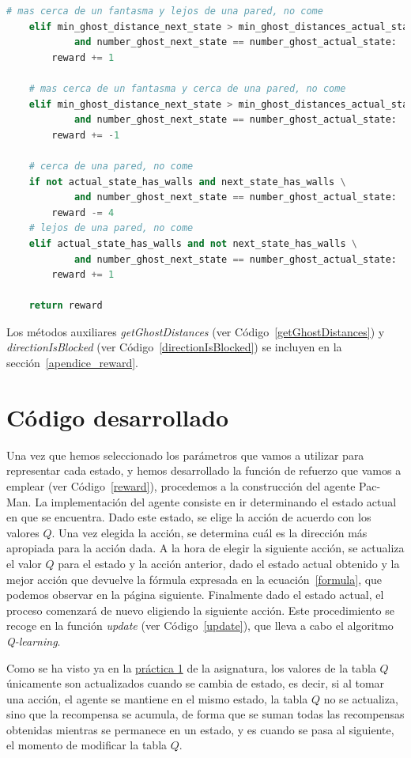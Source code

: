 \documentclass[11pt]{exam}
\begin{document}
\begin{lstlisting}[caption={Función de refuerzo.}, label={reward}, language=python, basicstyle=\footnotesize]
	# mas cerca de un fantasma y lejos de una pared, no come
	elif min_ghost_distance_next_state > min_ghost_distances_actual_state and not actual_state_has_walls \
			and number_ghost_next_state == number_ghost_actual_state:
		reward += 1
	
	# mas cerca de un fantasma y cerca de una pared, no come
	elif min_ghost_distance_next_state > min_ghost_distances_actual_state and actual_state_has_walls \
			and number_ghost_next_state == number_ghost_actual_state:
		reward += -1
	
	# cerca de una pared, no come
	if not actual_state_has_walls and next_state_has_walls \
			and number_ghost_next_state == number_ghost_actual_state:
		reward -= 4
	# lejos de una pared, no come
	elif actual_state_has_walls and not next_state_has_walls \
			and number_ghost_next_state == number_ghost_actual_state:
		reward += 1
	
	return reward	
\end{lstlisting}

Los métodos auxiliares \textit{getGhostDistances} (ver Código~\ref{getGhostDistances}) y \textit{directionIsBlocked} (ver Código~\ref{directionIsBlocked}) se incluyen en la sección~\ref*{apendice_reward}.

\section{Código desarrollado}\label{codigo}

Una vez que hemos seleccionado los parámetros que vamos a utilizar para representar cada estado, y hemos desarrollado la función de refuerzo que vamos a emplear (ver Código~\ref{reward}), procedemos a la construcción del agente Pac-Man. La implementación del agente consiste en ir determinando el estado actual en que se encuentra. Dado este estado, se elige la acción de acuerdo con los valores $Q$. Una vez elegida la acción, se determina cuál es la dirección más apropiada para la acción dada. A la hora de elegir la siguiente acción, se actualiza el valor $Q$ para el estado y la acción anterior, dado el estado actual obtenido y la mejor acción que devuelve la fórmula expresada en la ecuación~\ref{formula}, que podemos observar en la página siguiente. Finalmente dado el estado actual, el proceso comenzará de nuevo eligiendo la siguiente acción. Este procedimiento se recoge en la función \textit{update} (ver Código~\ref{update}), que lleva a cabo el algoritmo \textit{Q-learning}. 

Como se ha visto ya en la \href{https://poliformat.upv.es/portal/site/ESP_0_2835/tool/c07b745a-0cfd-44f0-a7a2-9bb22f80c3f7?panel=Main}{práctica 1} de la asignatura, los valores de la tabla $Q$ únicamente son actualizados cuando se cambia de estado, es decir, si al tomar una acción, el agente se mantiene en el mismo estado, la tabla $Q$ no se actualiza, sino que la recompensa se acumula, de forma que se suman todas las recompensas obtenidas mientras se permanece en un estado, y es cuando se pasa al siguiente, el momento de modificar la tabla $Q$. 
\end{document}
